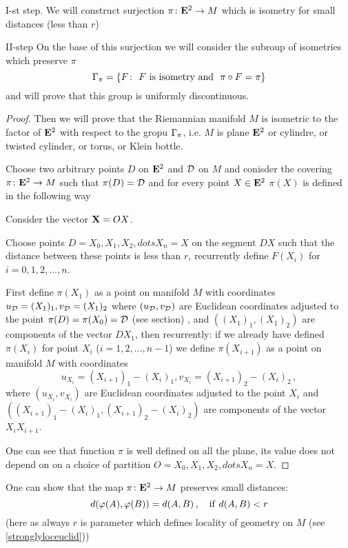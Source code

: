 \documentclass[12pt]{article}
\theoremstyle{theorem}
\theoremstyle{lemma}
\numberwithin{equation}{section}
\begin{document}
  I-st step. We will construct surjection  $\pi\colon {\bf E}^2\to M$
which is isometry for small distances (less than $r$)


 \medskip

   II-step On the base of this surjection we will 
consider the subroup
of isometries which preserve $\pi$
              $$
{\Gamma}_\pi=\{F\colon \,\, F\,\, 
 \hbox{is isometry and }\,\,\pi\circ F=\pi \}
              $$ 
and will prove that this group is uniformly discontinuous.

\begin{proof}

Then we will prove that the Riemannian manifold $M$ is isometric
to the factor of ${\bf E}^2$ with respect to the gropu ${\Gamma}_\pi$,
i.e. $M$ is  plane ${\bf E}^2$ or cylindre, or  twisted cylinder,
or torus, or Klein bottle.


Choose two arbitrary points $D$ on ${\bf E}^2$
and ${\cal D}$ on $M$ and conisder the covering 
$\pi\colon{\bf E}^2\to M$
such that $\pi(D)={\cal D}$ and for every point $X\in {\bf E}^2$
 $\pi(X)$ is defined in the following way
   
Consider the vector ${\bf X}=OX$.

Choose points $D=X_0,X_1,X_2,dots X_n=X$
on the segment  $DX$ such that 
the distance between these points is less than $r$,
recurrently  define $F(X_i)$ for $i=0,1,2,\dots,n$.

First define $\pi(X_1)$ as a point on manifold $M$
with coordinates $u_{\cal D}=(X_1)_1, v_{\cal D}=(X_1)_2$
where  $(u_{\cal D},v_{\cal D})$ are Euclidean coordinates
adjusted to the point $\pi(D)=\pi(X_0)={\cal D}$
(see section\label{localeuclidgeometry}) , and 
$\left((X_1)_1, (X_1)_2\right)$ are components
of the vector $DX_1$, then recurrently:
if we already have  defined $\pi(X_i)$ for point $X_i$
($i=1,2,\dots,n-1$)
we define $\pi(X_{i+1})$ as a point on manifold $M$
with coordinates 
          $$
 u_{X_i}=(X_{i+1})_1-(X_{i})_1, 
v_{X_i}=(X_{i+1})_2-(X_{i})_2\,,
              $$
where  $(u_{X_i},v_{X_i})$ are Euclidean coordinates
adjusted to the point $X_i$ and 
$\left((X_{i+1})_1-(X_{i})_1, (X_{i+1})_2-(X_{i})_2\right)$ 
are components
of the vector $X_i X_{i+1}$.

One can see that function $\pi$ is well defined
on all the plane, its value does not depend on
on a choice of partition 
$O=X_0,X_1,X_2,dots X_n=X$.
\end{proof}


One can show that the map $\pi\colon {\bf E}^2\to M$
preserves small distances:
                \begin{equation*}
        d(\varphi(A),\varphi(B))=d(A,B)\,,\quad
    {\rm if}\,\, d(A,B)<r
              \end{equation*}
(here as always $r$ is parameter which defines locality
of geometry on $M$ (see \eqref{stronglyloceuclid}))
\end{document}
